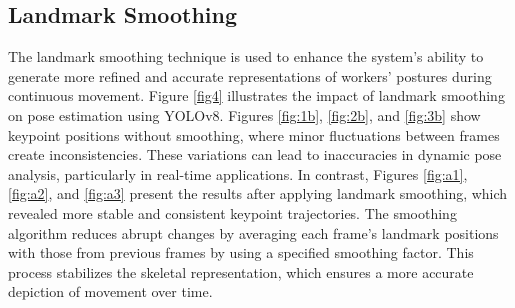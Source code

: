 \documentclass[11pt]{article}
\begin{document}

\subsection{Landmark Smoothing}

The landmark smoothing technique is used to enhance the system's ability to generate more refined and accurate representations of workers' postures during continuous movement. Figure \ref{fig4} illustrates the impact of landmark smoothing on pose estimation using YOLOv8. Figures \ref{fig:1b}, \ref{fig:2b}, and \ref{fig:3b} show keypoint positions without smoothing, where minor fluctuations between frames create inconsistencies. These variations can lead to inaccuracies in dynamic pose analysis, particularly in real-time applications. In contrast, Figures \ref{fig:a1}, \ref{fig:a2}, and \ref{fig:a3} present the results after applying landmark smoothing, which revealed more stable and consistent keypoint trajectories. The smoothing algorithm reduces abrupt changes by averaging each frame's landmark positions with those from previous frames by using a specified smoothing factor. This process stabilizes the skeletal representation, which ensures a more accurate depiction of movement over time. 
\end{document}
